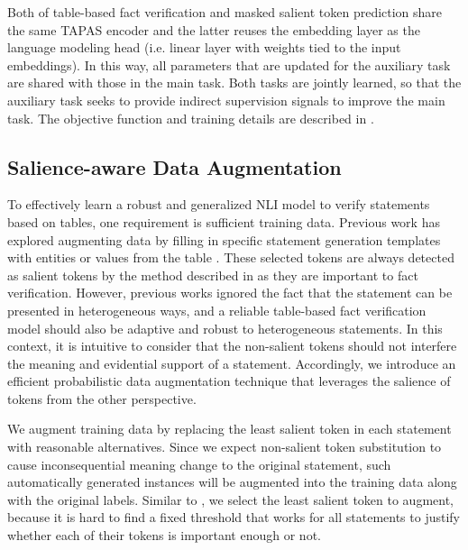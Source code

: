 \documentclass[11pt]{article}
\begin{document}
Both of table-based fact verification and masked salient token prediction share the same TAPAS encoder and the latter reuses the embedding layer as the language modeling head (i.e. linear layer with weights tied to the input embeddings). 
In this way, all parameters that are updated for the auxiliary task are shared with those in the main task.
Both tasks are jointly learned, so that the auxiliary task seeks to provide indirect supervision signals to improve the main task. 
The objective function and training details are described in .










\subsection{Salience-aware Data Augmentation}
\label{sec:aug}



To effectively learn a robust and generalized NLI model to verify statements based on tables, one requirement is sufficient training data.
Previous work has explored augmenting data 
by filling in specific statement generation templates with entities or values from the table \cite{eisenschlos2020understanding}.
These selected tokens are always detected as salient tokens by the method described in  as they are important to fact verification.
However, previous works ignored the fact that the statement can be presented in heterogeneous ways, and a reliable table-based fact verification model should also be adaptive and robust to heterogeneous statements.
In this context, it is intuitive to consider that the 
non-salient tokens
should not interfere the meaning and evidential support of a statement.
Accordingly, we introduce an efficient probabilistic data augmentation technique that leverages the salience of tokens from the other perspective.

We augment training data by replacing the least salient token in each statement with reasonable alternatives.
Since we expect non-salient token substitution to cause inconsequential meaning change to the original statement, such automatically generated instances will be augmented into the training data along with the original labels.
Similar to , we select the least salient token to augment, because it is hard to find a fixed threshold that works for all statements to justify whether each of their tokens is important enough or not.
\end{document}
